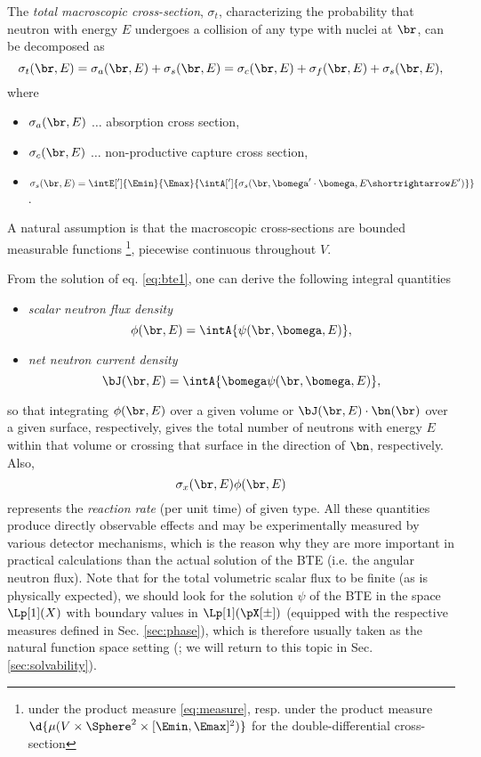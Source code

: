 The \textit{total macroscopic cross-section}, $\sigma_t$, characterizing the probability that neutron with energy $E$
undergoes a collision of any type with nuclei at $\br$, can be decomposed as $$
  \sigma_t(\br,E) = \sigma_a(\br,E) + \sigma_s(\br,E) = \sigma_c(\br,E) + \sigma_f(\br,E) + \sigma_s(\br,E),
$$ where
\begin{itemize}
	\item $\sigma_a(\br, E)$ $\ldots$ absorption cross section,
	\item $\sigma_c(\br, E)$ $\ldots$ non-productive capture cross section,
	\item $\displaystyle\sigma_s(\br, E) = \intE[']{\Emin}{\Emax}{\intA[']{\sigma_s(\br,\bomega'\cdot\bomega, 
	E\shortrightarrow E')}}$.
\end{itemize}
A natural assumption is that the macroscopic cross-sections are bounded measurable functions
\footnote{under the product measure \eqref{eq:measure}, resp. under the product measure $\d{\mu(V\times\Sphere^2\times
 [\Emin,\Emax]^2)}$ for the double-differential cross-section}, piecewise continuous throughout $V$. 

From the solution of eq. \eqref{eq:bte1}, one can derive the following integral quantities
\begin{itemize}
  \item \textit{scalar neutron flux density}
  \begin{equation}%
    \phi(\br, E) = \intA{\psi(\br,\bomega,E)},
  \end{equation}
  \item \textit{net neutron current density}
	\begin{equation}%
		\bJ(\br, E)	= \intA{\bomega\psi(\br,\bomega,E)},
	\end{equation}
\end{itemize}
so that integrating $\phi(\br, E)$ over a given volume or $\bJ(\br,E)\cdot\bn(\br)$ over a given surface, respectively,
gives the total number of neutrons with energy $E$ within that volume or crossing that surface in the direction of 
$\bn$, respectively. Also,
\begin{equation}\label{eq:rr}
  \sigma_x(\br, E) \phi(\br, E)
\end{equation}
represents the \textit{reaction rate} (per unit time) of given type. All these quantities produce directly observable 
effects and may be experimentally measured by various detector mechanisms, which is the reason why they are more 
important in practical calculations than the actual solution of the BTE (i.e. the angular neutron flux). Note that 
for the total volumetric scalar flux to be finite (as is physically expected), we should look for the solution $\psi$ 
of the BTE in the space $\Lp[1](X)$ with boundary values in $\Lp[1](\pX[\pm])$ (equipped with the respective measures
defined in Sec. \ref{sec:phase}), which is therefore usually taken as the natural function space setting 
(\cite{DautrayLions}; we will return to this topic in Sec. \ref{sec:solvability}).

